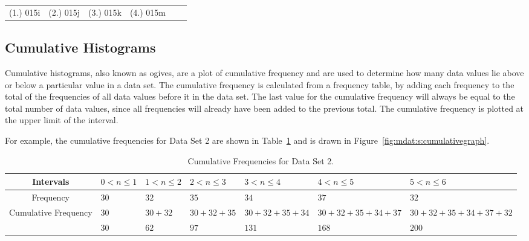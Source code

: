 {%
\par \practiceinfo
\par \begin{tabular}[h]{cccccc}
(1.)	015i	&
(2.)	015j	&
(3.)	015k	&
(4.)	015m	&
\end{tabular}}

\subsection{Cumulative Histograms}
Cumulative histograms, also known as ogives, are a plot of cumulative frequency and are used to determine how many data values lie above or below a particular value in a data set. The cumulative frequency is calculated from a frequency table, by adding each frequency to the total of the frequencies of all data values before it in the data set. The last value for the cumulative frequency will always be equal to the total number of data values, since all frequencies will already have been added to the previous total. The cumulative frequency is plotted at the upper limit of the interval.

For example, the cumulative frequencies for Data Set 2 are shown in Table~\ref{tab:mdat:s:cumulativeds2} and is drawn in Figure~\ref{fig:mdat:s:cumulativegraph}.

\begin{table}[htb]
\begin{center}
\begin{tabular}{|c||p{1.5cm}|p{1.5cm}|p{1.5cm}|p{1.5cm}|p{1.5cm}|p{1.5cm}|}\hline
Intervals & $0<n\leq 1 $ & $1<n\leq 2 $ & $2<n\leq 3 $ & $3<n\leq 4 $ & $4<n\leq 5$ & $5<n\leq 6 $ \\ 
\hline
Frequency & $30$ &$32$ &$35$ &$34$ &$37$ &$32$\\
\hline
Cumulative Frequency & $30$ &$30 + 32$ &$30 + 32 + 35$ &$30 + 32 + 35 + 34$ &$30 + 32 + 35 + 34 + 37 $&$30 + 32 + 35 + 34 + 37 + 32$\\
\hline
& $30$ &$ 62$ & $97$ & $131$ & $168$ & $200$\\
\hline
\end{tabular}
\caption{Cumulative Frequencies for Data Set 2. \label{tab:mdat:s:cumulativeds2}}
\end{center}
\end{table}

